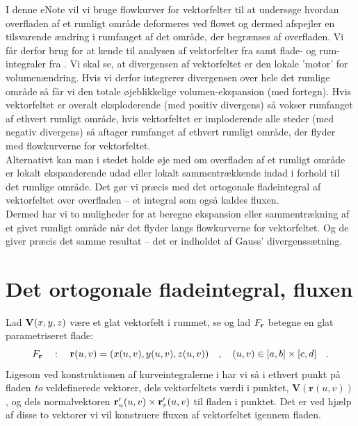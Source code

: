 \begin{basis}
I denne eNote vil vi bruge flowkurver for vektorfelter til at undersøge hvordan
overfladen af et rumligt område deformeres ved flowet og dermed afspejler en tilsvarende ændring i rumfanget af det område, der begrænses af overfladen.
Vi får derfor brug for at kende til analysen af vektorfelter fra  samt flade- og rum-integraler fra .
Vi skal se, at divergensen af vektorfeltet er den lokale 'motor' for volumenændring. Hvis vi derfor integrerer divergensen over hele det rumlige område så får vi den totale øjeblikkelige volumen-ekspansion (med fortegn).
Hvis vektorfeltet er overalt eksploderende (med positiv divergens) så vokser rumfanget af ethvert rumligt område, hvis vektorfeltet er imploderende alle steder (med negativ divergens)  så aftager rumfanget af ethvert rumligt  område, der flyder med flowkurverne for vektorfeltet. \\

Alternativt kan man i stedet holde øje med om overfladen af et rumligt område er lokalt ekspanderende udad eller lokalt sammentrækkende indad i forhold til det rumlige område. Det gør vi  præcis med det ortogonale fladeintegral af vektorfeltet over overfladen -- et integral som også kaldes fluxen. \\
Dermed har vi to muligheder for at beregne ekspansion eller sammentrækning af et givet rumligt område når det flyder langs flowkurverne for vektorfeltet. Og de giver præcis det samme resultat -- det er indholdet af Gauss' divergenssætning.
\end{basis}





\section{Det ortogonale fladeintegral, fluxen} \label{secFlux}

Lad ${\bf V}(x,y,z)$ være et glat vektorfelt i rummet, se  og lad $F_{\bf r}$ betegne en glat parametriseret flade:
\begin{equation}
F_{\bf r}\quad : \quad \mathbf{r}(u,v) = (x(u,v), y(u,v), z(u,v))\quad , \quad (u,v) \in [a,b] \times [c,d] \quad .
\end{equation}
Ligesom ved konstruktionen af kurveintegralerne i  har vi så i ethvert punkt på fladen \emph{to} veldefinerede vektorer, dels vektorfeltets værdi i punktet, $\mathbf{V}(\mathbf{r}(u,v))$, og dels normalvektoren ${\bf
r}'_{u}(u,v)\times{\bf r}'_{v}(u,v)$ til fladen i punktet. Det er ved hjælp af disse to vektorer vi vil konstruere fluxen af vektorfeltet igennem fladen.\\


